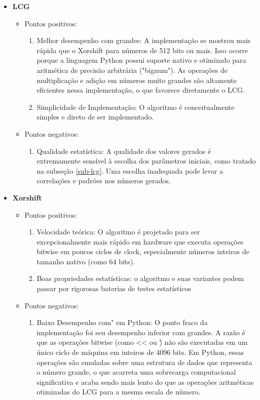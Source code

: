\documentclass[a4paper, 11pt]{article}
\begin{document}
\begin{itemize}
    \item \textbf{LCG}
    \begin{itemize}
        \item Pontos positivos:
        \begin{enumerate}
            \item Melhor desempenho com grandes: A implementação se mostrou mais rápida que o Xorshift para números de 512 bits ou mais. Isso ocorre porque a linguagem Python possui suporte nativo e otimizado para aritmética de precisão arbitrária ("bignum"). As operações de multiplicação e adição em números muito grandes são altamente eficientes nessa implementação, o que favorece diretamente o LCG.
            \item Simplicidade de Implementação: O algoritmo é conceitualmente simples e direto de ser implementado.
        \end{enumerate}
        \item Pontos negativos:
        \begin{enumerate}
            \item Qualidade estatística: A qualidade dos valores gerados é extremamente sensível à escolha dos parâmetros iniciais, como tratado na subseção \ref{sub-lcg}. Uma escolha inadequada pode levar a correlações e padrões nos números gerados.
        \end{enumerate}
    \end{itemize}

    \item \textbf{Xorshift} 
    \begin{itemize}
        \item Pontos positivos:
        \begin{enumerate}
            \item Velocidade teórica: O algoritmo é projetado para ser excepcionalmente mais rápido em hardware que executa operações bitwise em poucos ciclos de clock, especialmente números inteiros de tamanho nativo (como 64 bits).
            \item Boas propriedades estatísticas: o algoritmo e suas variantes podem passar por rigorosas baterias de testes estatísticos
        \end{enumerate}

        \item Pontos negativos:
        \begin{enumerate}
            \item Baixo Desempenho com" em Python: O ponto fraco da implementação foi seu desempenho inferior com grandes. A razão é que as operações bitwise (como << ou \^) não são executadas em um único ciclo de máquina em inteiros de 4096 bits. Em Python, essas operações são emuladas sobre uma estrutura de dados que representa o número grande, o que acarreta uma sobrecarga computacional significativa e acaba sendo mais lento do que as operações aritméticas otimizadas do LCG para a mesma escala de número.
        \end{enumerate}
    \end{itemize}
\end{itemize}
\end{document}
